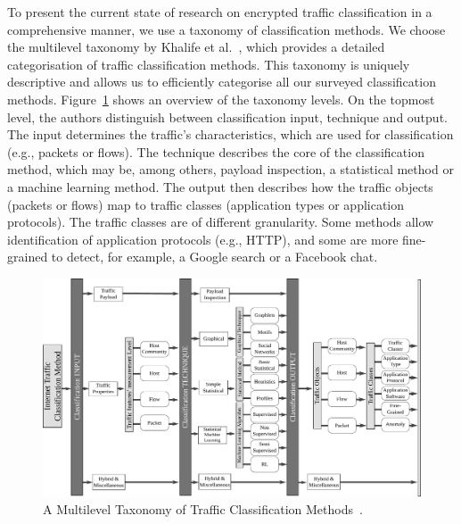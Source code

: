 To present the current state of research on encrypted traffic classification in a comprehensive manner, we use a taxonomy of classification methods. We choose the multilevel taxonomy by Khalife et al.~\cite{Khalife-2014-multilevel}, which provides a detailed categorisation of traffic classification methods. This taxonomy is uniquely descriptive and allows us to efficiently categorise all our surveyed classification methods. Figure~\ref{fig:taxonomy} shows an overview of the taxonomy levels. On the topmost level, the authors distinguish between classification input, technique and output. The input determines the traffic's characteristics, which are used for classification (e.g., packets or flows). The technique describes the core of the classification method, which may be, among others, payload inspection, a statistical method or a machine learning method. The output then describes how the traffic objects (packets or flows) map to traffic classes (application types or application protocols). The traffic classes are of different granularity. Some methods allow identification of application protocols (e.g., HTTP), and some are more fine-grained to detect, for example, a Google search or a Facebook chat.

\begin{figure}[!ht]
    \begin{center}
        \includegraphics[width=\textwidth]{figures/paper-encrypted/taxonomy}
        \caption{A Multilevel Taxonomy of Traffic Classification Methods~\cite{Khalife-2014-multilevel}.} 
        \label{fig:taxonomy}
    \end{center}
\end{figure}


